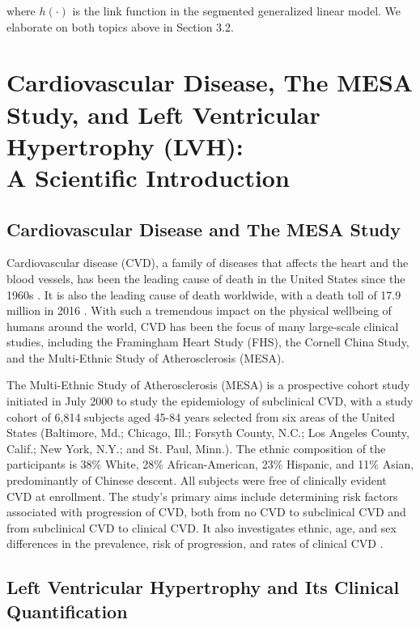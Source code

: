 \documentclass [12pt, proquest] {uwthesis}[2016/11/22]
\begin{document}
where $h(\cdot)$ is the link function in the segmented generalized linear model. We elaborate on both topics above in Section 3.2.

 
\chapter{Cardiovascular Disease, The MESA Study, and Left Ventricular Hypertrophy (LVH): \\ A Scientific Introduction}

\section{Cardiovascular Disease and The MESA Study}
Cardiovascular disease (CVD), a family of diseases that affects the heart and the blood vessels, has been the leading cause of death in the United States since the 1960s \cite{JD2014}. It is also the leading cause of death worldwide, with a death toll of 17.9 million in 2016 \cite{WHO}. With such a tremendous impact on the physical wellbeing of humans around the world, CVD has been the focus of many large-scale clinical studies, including the Framingham Heart Study (FHS), the Cornell China Study, and the Multi-Ethnic Study of Atherosclerosis (MESA).

The Multi-Ethnic Study of Atherosclerosis (MESA) is a prospective cohort study initiated in July 2000 to study the epidemiology of subclinical CVD, with a study cohort of 6,814 subjects aged 45-84 years selected from six areas of the United States (Baltimore, Md.; Chicago, Ill.; Forsyth County, N.C.; Los Angeles County, Calif.; New York, N.Y.; and St. Paul, Minn.). The ethnic composition of the participants is 38\% White, 28\% African-American, 23\% Hispanic, and 11\% Asian, predominantly of Chinese descent. All subjects were free of clinically evident CVD at enrollment. The study's primary aims include determining risk factors associated with progression of CVD, both from no CVD to subclinical CVD and from subclinical CVD to clinical CVD. It also investigates ethnic, age, and sex differences in the prevalence, risk of progression, and rates of clinical CVD \cite{MESA}.

\section{Left Ventricular Hypertrophy and Its Clinical Quantification}
\end{document}
